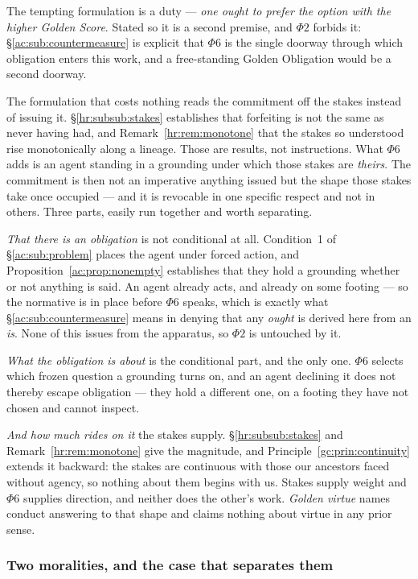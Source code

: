 \documentclass[11pt]{article}
\numberwithin{equation}{section}
\theoremstyle{plain}
\theoremstyle{definition}
\theoremstyle{remark}
\begin{document}
The tempting formulation is a duty --- \emph{one ought to prefer the
option with the higher Golden Score}. Stated so it is a second premise,
and $\Phi2$ forbids it: \S\ref{ac:sub:countermeasure} is explicit that
$\Phi6$ is the single doorway through which obligation enters this work,
and a free-standing Golden Obligation would be a second doorway.

The formulation that costs nothing reads the commitment off the stakes
instead of issuing it. \S\ref{hr:subsub:stakes} establishes that
forfeiting is not the same as never having had, and
Remark~\ref{hr:rem:monotone} that the stakes so understood rise
monotonically along a lineage. Those are results, not instructions. What
$\Phi6$ adds is an agent standing in a grounding under which those stakes
are \emph{theirs}. The commitment is then not an imperative anything
issued but the shape those stakes take once occupied --- and it is
revocable in one specific respect and not in others. Three parts, easily
run together and worth separating.

\emph{That there is an obligation} is not conditional at all. Condition~1
of \S\ref{ac:sub:problem} places the agent under forced action, and
Proposition~\ref{ac:prop:nonempty} establishes that they hold a grounding
whether or not anything is said. An agent already acts, and already on
some footing --- so the normative is in place before $\Phi6$ speaks,
which is exactly what \S\ref{ac:sub:countermeasure} means in denying that
any \emph{ought} is derived here from an \emph{is}. None of this issues
from the apparatus, so $\Phi2$ is untouched by it.

\emph{What the obligation is about} is the conditional part, and the only
one. $\Phi6$ selects which frozen question a grounding turns on, and an
agent declining it does not thereby escape obligation --- they hold a
different one, on a footing they have not chosen and cannot inspect.

\emph{And how much rides on it} the stakes supply.
\S\ref{hr:subsub:stakes} and Remark~\ref{hr:rem:monotone} give the
magnitude, and Principle~\ref{gc:prin:continuity} extends it backward:
the stakes are continuous with those our ancestors faced without agency,
so nothing about them begins with us. Stakes supply weight and $\Phi6$
supplies direction, and neither does the other's work. \emph{Golden virtue} names conduct answering to that shape and
claims nothing about virtue in any prior sense.

\subsubsection{Two moralities, and the case that separates them}
\label{gs:ssub:twomoralities}
\end{document}
